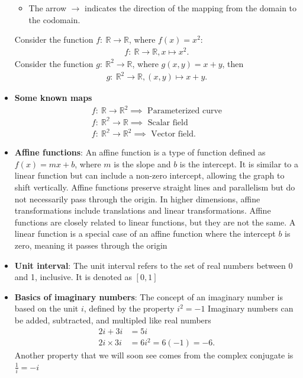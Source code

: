 \documentclass{report}
\begin{document}
\begin{itemize}
\begin{itemize}
                \item The arrow $\to$ indicates the direction of the mapping from the domain to the codomain.
            \end{itemize}
            \bigbreak \noindent 
            Consider the function $f:\ \mathbb{R}  \to \mathbb{R}$, where $f(x) = x^{2}$:
            \begin{align*}
                f:\ \mathbb{R} \to \mathbb{R}, x \mapsto x^{2}
            .\end{align*}
            \bigbreak \noindent 
            Consider the function $g:\ \mathbb{R}^{2} \to \mathbb{R}$, where $g(x,y) = x + y$, then 
            \begin{align*}
               g:\ \mathbb{R}^{2} \to \mathbb{R}, (x,y) \mapsto x + y  
            .\end{align*}
        \item \textbf{Some known maps}
            \begin{align*}
                f:\ \mathbb{R} \to \mathbb{R}^{2} \implies \text{ Parameterized curve}  \\
                f:\ \mathbb{R^{2}} \to \mathbb{R} \implies \text{ Scalar field}  \\
                f:\ \mathbb{R^{2}} \to \mathbb{R}^{2} \implies \text{ Vector field} 
            .\end{align*}
        \item \textbf{Affine functions}:
            An affine function is a type of function defined as $f(x)=mx+b$, where $m$ is the slope and $b$ is the intercept. It is similar to a linear function but can include a non-zero intercept, allowing the graph to shift vertically. Affine functions preserve straight lines and parallelism but do not necessarily pass through the origin. In higher dimensions, affine transformations include translations and linear transformations.
            \bigbreak \noindent 
            Affine functions are closely related to linear functions, but they are not the same. A linear function is a special case of an affine function where the intercept $b$ is zero, meaning it passes through the origin
        \item \textbf{Unit interval}: The unit interval refers to the set of real numbers between 0 and 1, inclusive. It is denoted as $[0,1]$
        \item \textbf{Basics of imaginary numbers}: The concept of an imaginary number is based on the unit $i$, defined by the property $i^{2} = -1$
            \bigbreak \noindent 
            Imaginary numbers can be added, subtracted, and multipled like real numbers
            \begin{align*}
                2i + 3i &= 5i \\ 
                2i \times 3i &= 6i^{2} = 6(-1) = -6
            .\end{align*}
            \bigbreak \noindent 
            Another property that we will soon see comes from the complex conjugate is $\frac{1}{i} = -i$
        


\end{itemize}
\end{document}

